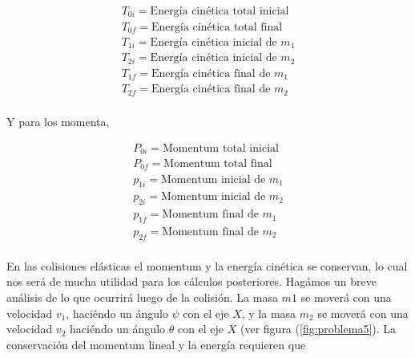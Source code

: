 \documentclass[a4paper,10pt]{article}
\begin{document}
 \begin{gather*}
  T_{0i} = \textrm{Energía cinética total inicial} \\
%
  T_{0f} = \textrm{Energía cinética total final} \\
%  
%  
   T_{1i} = \textrm{Energía cinética inicial de } m_1 \\
%   
   T_{2i} = \textrm{Energía cinética inicial de } m_2 \\
%  
  T_{1f} = \textrm{Energía cinética final de } m_1 \\
%  
  T_{2f} = \textrm{Energía cinética final de } m_2 \\
%
\label{eq:energiasCineticas}
  \end{gather*}
  
Y para los momenta,

 \begin{gather*}
  P_{0i} = \textrm{Momentum total inicial} \\
  P_{0f} = \textrm{Momentum total final} \\
%  
   p_{1i} = \textrm{Momentum inicial de } m_1 \\
%   
   p_{2i} = \textrm{Momentum inicial de } m_2 \\
%  
  p_{1f} = \textrm{Momentum final de } m_1 \\
%  
  p_{2f} = \textrm{Momentum final de } m_2 \\
%
\label{eq:Momenta}
  \end{gather*}
  
En las colisiones elásticas el momentum y la energía cinética se conservan, lo cual nos 
será de mucha utilidad para los cálculos posteriores. Hagámos un breve análisis de lo 
que ocurrirá luego de la colisión. La masa $m1$ se moverá con una velocidad $v_1$,
haciéndo un ángulo $\psi$ con el eje $X$, y la masa $m_2$ se moverá con una 
velocidad $v_2$ haciéndo un ángulo $\theta$ con el eje $X$ (ver figura (\ref{fig:problema5}). La conservación 
del momentum lineal y la energía requieren que 
\end{document}
